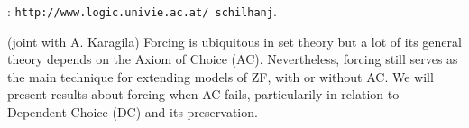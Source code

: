 \documentclass[bsl,meeting]{asl}
\def\urladdr#1{\endgraf\noindent{\it URL Address}: {\tt #1}.}
\newcommand{\NP}{}
\begin{document}
\thispagestyle{empty}


\NP  
{}
\urladdr{http://www.logic.univie.ac.at/\string~schilhanj}


(joint with A. Karagila) Forcing is ubiquitous in set theory but a lot of its general theory depends on the Axiom of Choice (AC). Nevertheless, forcing still serves as the main technique for extending models of ZF, with or without AC. We will present results about forcing when AC fails, particularily in relation to Dependent Choice (DC) and its preservation. 
\end{document}
